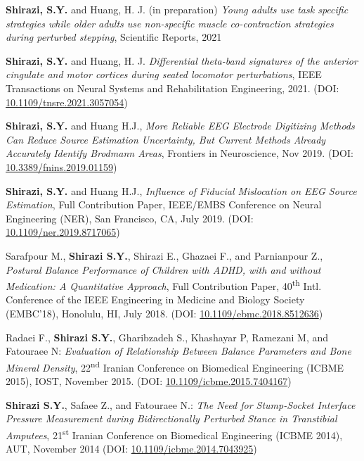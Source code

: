 \documentclass[10pt]{res} %
\newcommand{\tss}[1]{\textsuperscript{#1}}
\begin{document}
\begin{resume}
\textbf{Shirazi, S.Y.} and Huang, H. J. (in preparation)\textit{ Young adults use task specific strategies while older adults use non-specific muscle co-contraction strategies during perturbed stepping}, Scientific Reports, 2021

\textbf{Shirazi, S.Y.} and Huang, H. J. \textit{Differential theta-band signatures of the anterior cingulate and motor cortices during seated locomotor perturbations}, IEEE Transactions on Neural Systems and Rehabilitation Engineering, 2021. (DOI: \href{https://ieeexplore.ieee.org/document/9347561}{10.1109/tnsre.2021.3057054})

{\bf Shirazi, S.Y.} and Huang H.J., {\sl More Reliable EEG Electrode Digitizing Methods Can Reduce Source Estimation Uncertainty, But Current Methods Already Accurately Identify Brodmann Areas}, Frontiers in Neuroscience, Nov 2019. (DOI: {\href{https://www.frontiersin.org/articles/10.3389/fnins.2019.01159/}{10.3389/fnins.2019.01159}})

{\bf Shirazi, S.Y.} and Huang H.J., {\sl Influence of Fiducial Mislocation on EEG Source Estimation}, Full Contribution Paper, IEEE/EMBS Conference on Neural Engineering (NER), San Francisco, CA, July 2019. (DOI: \href{https://doi.org/10.1109/NER.2019.8717065}{10.1109/ner.2019.8717065})

Sarafpour M., {\bf Shirazi S.Y.}, Shirazi E., Ghazaei F., and Parnianpour Z., {\sl Postural Balance Performance of Children with ADHD, with and without Medication: A Quantitative Approach}, Full Contribution Paper, 40\tss{th} Intl. Conference of the IEEE Engineering in Medicine and Biology Society (EMBC’18), Honolulu, HI, July 2018. (DOI: \href{https://ieeexplore.ieee.org/document/8512636}{10.1109/ebmc.2018.8512636})

Radaei F., {\bf Shirazi S.Y.}, Gharibzadeh S., Khashayar P, Ramezani M, and Fatouraee N: {\sl Evaluation of Relationship Between Balance Parameters and Bone Mineral Density}, 22\tss{nd} Iranian Conference on Biomedical Engineering (ICBME 2015), IOST, November 2015. (DOI: \href{https://ieeexplore.ieee.org/document/7404167}{10.1109/icbme.2015.7404167})

{\bf Shirazi S.Y.}, Safaee Z., and Fatouraee N.: {\sl The Need for Stump-Socket Interface Pressure Measurement during Bidirectionally Perturbed Stance in Transtibial Amputees}, 21\tss{st} Iranian Conference on Biomedical Engineering (ICBME 2014), AUT, November 2014 (DOI: \href{https://ieeexplore.ieee.org/document/7043925}{10.1109/icbme.2014.7043925})

\vspace{0.01in} %


\end{resume}
\end{document}
